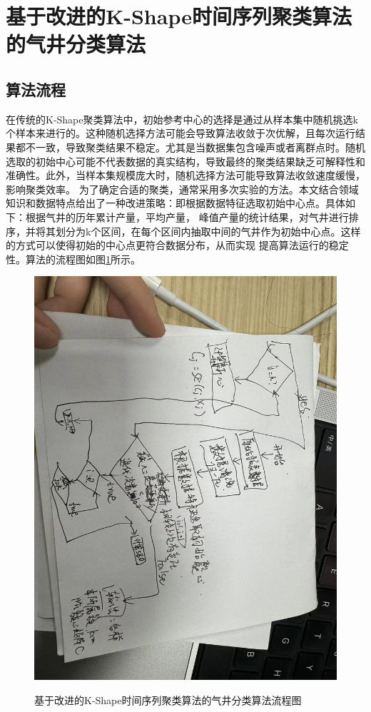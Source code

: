 \section{基于改进的K-Shape时间序列聚类算法的气井分类算法}
\subsection{算法流程}
在传统的K-Shape聚类算法中，初始参考中心的选择是通过从样本集中随机挑选k个样本来进行的。这种随机选择方法可能会导致算法收敛于次优解，且每次运行结果都不一致，导致聚类结果不稳定。尤其是当数据集包含噪声或者离群点时。随机选取的初始中心可能不代表数据的真实结构，导致最终的聚类结果缺乏可解释性和准确性。此外，当样本集规模庞大时，随机选择方法可能导致算法收敛速度缓慢，影响聚类效率。
为了确定合适的聚类，通常采用多次实验的方法。本文结合领域知识和数据特点给出了一种改进策略：即根据数据特征选取初始中心点。具体如下：根据气井的历年累计产量，平均产量，
峰值产量的统计结果，对气井进行排序，并将其划分为k个区间，在每个区间内抽取中间的气井作为初始中心点。这样的方式可以使得初始的中心点更符合数据分布，从而实现
提高算法运行的稳定性。算法的流程图如图\ref{fig:K-Shape}所示。
\begin{figure}
    \centering
    \includegraphics[scale=0.15,angle=0]{figure/K-Shape.jpg}\\
    \caption{基于改进的K-Shape时间序列聚类算法的气井分类算法流程图}
    \label{fig:K-Shape}
\end{figure}
